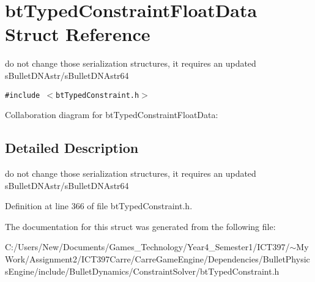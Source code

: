 \hypertarget{structbt_typed_constraint_float_data}{
\section{btTypedConstraintFloatData Struct Reference}
\label{structbt_typed_constraint_float_data}
}
do not change those serialization structures, it requires an updated sBulletDNAstr/sBulletDNAstr64  


{\tt \#include $<$btTypedConstraint.h$>$}

Collaboration diagram for btTypedConstraintFloatData:

\subsection{Detailed Description}
do not change those serialization structures, it requires an updated sBulletDNAstr/sBulletDNAstr64 

Definition at line 366 of file btTypedConstraint.h.

The documentation for this struct was generated from the following file:\begin{CompactItemize}
\item 
C:/Users/New/Documents/Games\_\-Technology/Year4\_\-Semester1/ICT397/$\sim$My Work/Assignment2/ICT397Carre/CarreGameEngine/Dependencies/BulletPhysicsEngine/include/BulletDynamics/ConstraintSolver/btTypedConstraint.h\end{CompactItemize}
